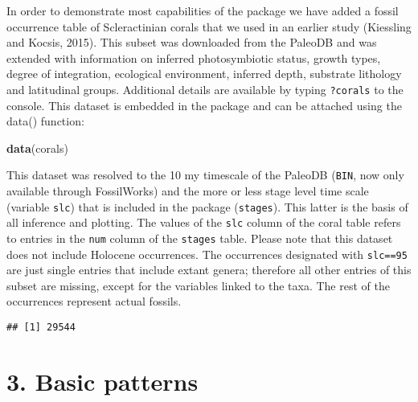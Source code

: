\documentclass[]{article}
\newenvironment{Shaded}{\begin{snugshade}}{\end{snugshade}}
\newcommand{\CommentTok}[1]{\textcolor[rgb]{0.56,0.35,0.01}{\textit{#1}}}
\newcommand{\DecValTok}[1]{\textcolor[rgb]{0.00,0.00,0.81}{#1}}
\newcommand{\KeywordTok}[1]{\textcolor[rgb]{0.13,0.29,0.53}{\textbf{#1}}}
\newcommand{\NormalTok}[1]{#1}
\newcommand{\OperatorTok}[1]{\textcolor[rgb]{0.81,0.36,0.00}{\textbf{#1}}}
\newcommand{\StringTok}[1]{\textcolor[rgb]{0.31,0.60,0.02}{#1}}
\begin{document}
In order to demonstrate most capabilities of the package we have added a
fossil occurrence table of Scleractinian corals that we used in an
earlier study (Kiessling and Kocsis, 2015). This subset was downloaded
from the PaleoDB and was extended with information on inferred
photosymbiotic status, growth types, degree of integration, ecological
environment, inferred depth, substrate lithology and latitudinal groups.
Additional details are available by typing \texttt{?corals} to the
console. This dataset is embedded in the package and can be attached
using the data() function:

\begin{Shaded}
\begin{Highlighting}[]
\KeywordTok{data}\NormalTok{(corals)}
\end{Highlighting}
\end{Shaded}

This dataset was resolved to the 10 my timescale of the PaleoDB
(\texttt{BIN}, now only available through FossilWorks) and the more or
less stage level time scale (variable \texttt{slc}) that is included in
the package (\texttt{stages}). This latter is the basis of all inference
and plotting. The values of the \texttt{slc} column of the coral table
refers to entries in the \texttt{num} column of the \texttt{stages}
table. Please note that this dataset does not include Holocene
occurrences. The occurrences designated with \texttt{slc==95} are just
single entries that include extant genera; therefore all other entries
of this subset are missing, except for the variables linked to the taxa.
The rest of the occurrences represent actual fossils.

\begin{Shaded}
\end{Shaded}

\begin{verbatim}
## [1] 29544
\end{verbatim}

\hypertarget{basic-patterns}{%
\section{3. Basic patterns}\label{basic-patterns}}
\end{document}
